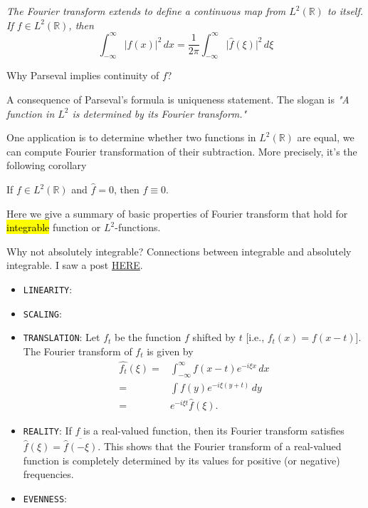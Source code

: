 \begin{Proposition}[Proposition 4.2.5.]

\textit{The Fourier transform extends to define a continuous map from $L^2(\mathbb R)$ to itself. If $f\in L^2(\mathbb R)$, then \begin{equation*}
    \int_{-\infty}^{\infty}\vert f(x)\vert ^2 \,dx=\frac{1}{2\pi}\int_{-\infty}^{\infty}\vert\hat{f}(\xi)\vert^2\,d\xi
\end{equation*}}

\begin{Question}
    Why Parseval implies continuity of $f$?
\end{Question}

A consequence of Parseval's formula is uniqueness statement. The slogan is \textit{"A  function in $L^2$ is determined by its Fourier transform."}

One application is to determine whether two functions in $L^2(\mathbb R)$ are equal, we can compute Fourier transformation of their subtraction. More precisely, it's the following corollary

\begin{coro}
    If $f\in L^2(\mathbb R)$ and $\hat{f}=0$, then $f\equiv 0$.
\end{coro}

\begin{prop}


\end{prop}

Here we give a summary of basic properties of Fourier transform that hold for \hl{integrable} function or $L^2$-functions. 

\begin{Question}
    Why not absolutely integrable? Connections between integrable and absolutely integrable. I saw a post \href{https://math.stackexchange.com/questions/2255939/does-absolute-integrability-imply-integrability}{HERE}.
\end{Question}

\begin{itemize}
    \item \texttt{LINEARITY}:
    \item \texttt{SCALING}:
    \item \texttt{TRANSLATION}: Let $f_t$ be the function $f$ shifted by $t$ [i.e., $f_t(x)=f(x-t)$]. The Fourier transform of $f_t$ is given by \begin{align*}
        \hat{f_t}(\xi) =& \int_{-\infty}^{\infty} f(x-t)e^{-i\xi x}\,dx\\
        =& \int f(y)e^{-i\xi(y+t)}\,dy\\
        =& e^{-i\xi t} \hat{f}(\xi).
    \end{align*}
    \item \texttt{REALITY}: If $f$ is a real-valued function, then its Fourier transform satisfies \(\hat{f}(\xi)=\overline{\hat{f}(-\xi)}\). This shows that the Fourier transform of a real-valued function is completely determined by its values for positive (or negative) frequencies. 
    \item \texttt{EVENNESS}:
\end{itemize}


\end{Proposition}

